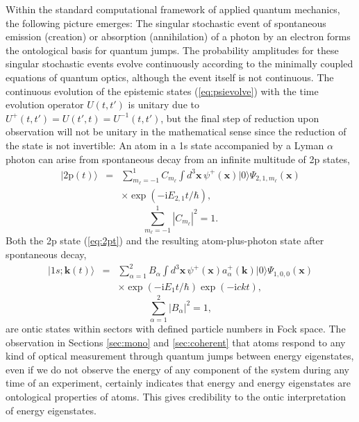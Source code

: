 \documentclass[final,3p,12pt]{elsarticle3}
\begin{document}
Within the standard computational framework of applied quantum mechanics, 
the following picture emerges:
The singular stochastic event of spontaneous emission (creation) or 
absorption (annihilation) of a photon by an electron forms the ontological
basis for quantum jumps. The probability amplitudes for these singular
stochastic events evolve continuously according to
the minimally coupled equations of quantum optics, although the event
itself is not continuous. The continuous evolution of the epistemic 
states (\ref{eq:psievolve}) with the time evolution operator
$U(t,t')$ is unitary due to $U^+(t,t')=U(t',t)=U^{-1}(t,t')$, 
but the final step of reduction upon observation
will not be unitary in the mathematical sense since the reduction of the
state is not invertible: An atom in a 1s state accompanied by a 
Lyman $\alpha$ photon can arise from spontaneous decay from an infinite 
multitude of 2p states,
\begin{eqnarray} \nonumber
\bm{|}2\mathrm{p}(t)\bm{\rangle}&=&\sum_{m_\ell=-1}^1C_{m_\ell}
\int\!d^3\bm{x}\,\psi^+(\bm{x})\bm{|}0\bm{\rangle}
\Psi_{2,1,m_\ell}(\bm{x})
\\ \label{eq:2pt}
&&\times\exp(-\mathrm{i}E_{2,1}t/\hbar),
\end{eqnarray}
\[
\sum_{m_\ell=-1}^1\left|C_{m_\ell}\right|^2=1.
\]
Both the 2p state (\ref{eq:2pt}) and the resulting atom-plus-photon state
after spontaneous decay,
\begin{eqnarray} \nonumber
\bm{|}1s;\bm{k}(t)\bm{\rangle}&=&\sum_{\alpha=1}^2B_{\alpha}
\int\!d^3\bm{x}\,\psi^+(\bm{x})a^+_{\alpha}(\bm{k})\bm{|}0\bm{\rangle}
\Psi_{1,0,0}(\bm{x})
\\ \label{eq:1sgammat}
&&\times\exp(-\mathrm{i}E_{1}t/\hbar)\exp(-\mathrm{i}ckt),
\end{eqnarray}
\[
\sum_{\alpha=1}^2\left|B_{\alpha}\right|^2=1,
\]
are ontic states within sectors with defined particle numbers in Fock space. 
The observation in Sections \ref{sec:mono} and \ref{sec:coherent} 
that atoms respond to any kind of optical measurement
through quantum jumps between energy eigenstates, even if we do not observe the energy
of any component of the system during any time of an experiment, certainly indicates
that energy and energy eigenstates are ontological properties of atoms. This
gives credibility to the ontic interpretation of energy eigenstates.
\end{document}
